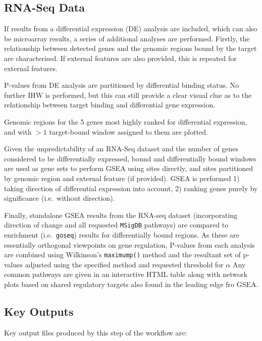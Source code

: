 \documentclass[
]{book}
\begin{document}
\hypertarget{rna-seq-data}{%
\subsection*{RNA-Seq Data}\label{rna-seq-data}}

If results from a differential expression (DE) analysis are included, which can also be microarray results, a series of additional analyses are performed.
Firstly, the relationship between detected genes and the genomic regions bound by the target are characterised.
If external features are also provided, this is repeated for external features.

P-values from DE analysis are partitioned by differential binding status.
No further IHW is performed, but this can still provide a clear visual clue as to the relationship between target binding and differential gene expression.

Genomic regions for the 5 genes most highly ranked for differential expression, and with \(>1\) target-bound window assigned to them are plotted.

Given the unpredictability of an RNA-Seq dataset and the number of genes considered to be differentially expressed, bound and differentially bound windows are used as gene sets to perform GSEA\citep{fgsea} using sites directly, and sites partitioned by genomic region and external feature (if provided).
GSEA is performed 1) taking direction of differential expression into account, 2) ranking genes purely by significance (i.e.~without direction).

Finally, standalone GSEA results from the RNA-seq dataset (incorporating direction of change and all requested \texttt{MSigDB} pathways) are compared to enrichment (i.e.~\texttt{goseq}) results for differentially bound regions.
As these are essentially orthogonal viewpoints on gene regulation, P-values from each analysis are combined using Wilkinson's \texttt{maximump()} method and the resultant set of p-values adjusted using the specified method and requested threshold for \(\alpha\)
Any common pathways are given in an interactive HTML table along with network plots based on shared regulatory targets also found in the leading edge fro GSEA.

\hypertarget{key-outputs-1}{%
\subsection*{Key Outputs}\label{key-outputs-1}}

Key output files produced by this step of the workflow are:
\end{document}
